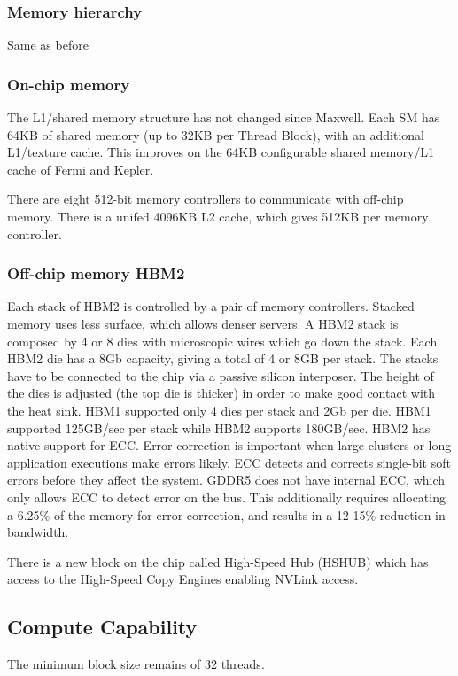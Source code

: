 \subsubsection{Memory hierarchy}
Same as before

\subsubsection{On-chip memory}
The L1/shared memory structure has not changed since Maxwell.
Each SM has 64KB of shared memory (up to 32KB per Thread Block), with an additional L1/texture cache.
This improves on the 64KB configurable shared memory/L1 cache of Fermi and Kepler.

There are eight 512-bit memory controllers to communicate with off-chip memory.
There is a unifed 4096KB L2 cache, which gives 512KB per memory controller.

\subsubsection{Off-chip memory HBM2}
Each stack of HBM2 is controlled by a pair of memory controllers.
Stacked memory uses less surface, which allows denser servers.
A HBM2 stack is composed by 4 or 8 dies with microscopic wires which go down the stack.
Each HBM2 die has a 8Gb capacity, giving a total of 4 or 8GB per stack.
The stacks have to be connected to the chip via a passive silicon interposer.
The height of the dies is adjusted (the top die is thicker) in order to make good contact with the heat sink.
HBM1 supported only 4 dies per stack and 2Gb per die.
HBM1 supported 125GB/sec per stack while HBM2 supports 180GB/sec.
HBM2 has native support for ECC.
Error correction is important when large clusters or long application executions make errors likely.
ECC detects and corrects single-bit soft errors before they affect the system.
GDDR5 does not have internal ECC, which only allows ECC to detect error on the bus.
This additionally requires allocating a 6.25\% of the memory for error correction, and results in a 12-15\% reduction in bandwidth.

There is a new block on the chip called High-Speed Hub (HSHUB) which has access to the High-Speed Copy Engines enabling NVLink access.

\subsection{Compute Capability}
The minimum block size remains of 32 threads.
